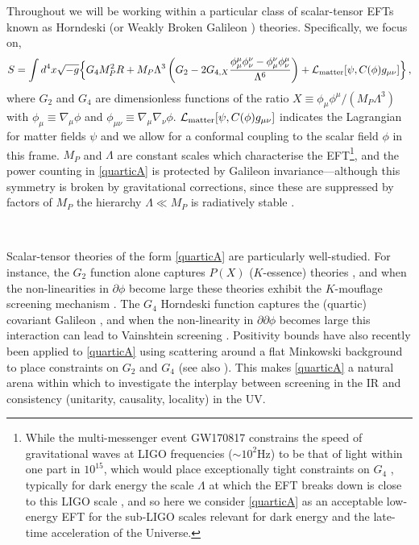 \documentclass[11pt]{article}
\begin{document}
Throughout we will be working within a particular class of scalar-tensor EFTs known as Horndeski \cite{Horndeski:1974wa,Deffayet:2009wt} (or Weakly Broken Galileon \cite{Pirtskhalava:2015nla}) theories. Specifically, we focus on, 
\begin{align}\label{quarticA}
S = \int d^4x \sqrt{-g} \Big\{   G_{4}  M_P^2 R   +  M_P \Lambda^3 \left( G_{2}   -  2 G_{4,X}  \frac{ \phi^\mu_\mu \phi^\nu_\nu - \phi_\mu^\nu \phi^\mu_\nu }{\Lambda^6}  \right)    + \mathcal{L}_{\rm matter} [ \psi , C(\phi) g_{\mu\nu} ] \Big\}\,,
\end{align}
where $G_2$ and $G_4$ are dimensionless functions of the ratio $X \equiv \phi_\mu \phi^\mu/(M_P\Lambda^3)$ with $\phi_\mu \equiv \nabla_\mu \phi$ and $\phi_{\mu\nu} \equiv \nabla_{\mu} \nabla_\nu \phi$. 
$\mathcal{L}_{\rm matter} [ \psi , C(\phi) g_{\mu\nu} ]$ indicates the Lagrangian for matter fields $\psi$ and we allow for a conformal coupling to the scalar field $\phi$ in this frame. 
%
$M_P$ and $\Lambda$ are constant scales which characterise the EFT\footnote{
While the multi-messenger event GW170817 \cite{TheLIGOScientific:2017qsa,Monitor:2017mdv,GBM:2017lvd} constrains the speed of gravitational waves at LIGO frequencies ($\sim 10^2$Hz) to be that of light within one part in $10^{15}$, which would place exceptionally tight constraints on $G_4$  \cite{Lombriser:2015sxa,Lombriser:2016yzn,Creminelli:2017sry, Sakstein:2017xjx, Ezquiaga:2017ekz, Baker:2017hug, Akrami:2018yjz, Heisenberg:2017qka, BeltranJimenez:2018ymu}, typically for dark energy the scale $\Lambda$ at which the EFT breaks down is close to this LIGO scale \cite{deRham:2018red}, and so here we consider \eqref{quarticA} as an acceptable low-energy EFT for the sub-LIGO scales relevant for dark energy and the late-time acceleration of the Universe.
}, and the power counting in \eqref{quarticA} is protected by Galileon invariance---although this symmetry is broken by gravitational corrections, since these are suppressed by factors of $M_P$ the hierarchy $ \Lambda \ll M_P$ is radiatively stable \cite{Luty:2003vm,Nicolis:2004qq,deRham:2010eu,Burrage:2010cu}.

~

Scalar-tensor theories of the form \eqref{quarticA} are particularly well-studied. For instance, the $G_2$ function alone captures $P(X)$ ($K$-essence) theories \cite{ArmendarizPicon:1999rj, Garriga:1999vw}, and when the non-linearities in $\partial \phi$ become large these theories exhibit the $K$-mouflage screening mechanism \cite{Babichev:2009ee}. The $G_4$ Horndeski function captures the (quartic) covariant Galileon \cite{Nicolis:2008in, Deffayet:2009wt}, and when the non-linearity in $\partial \partial \phi$ becomes large this interaction can lead to Vainshtein screening \cite{Vainshtein:1972sx, Koyama:2013paa}. Positivity bounds have also recently been applied to \eqref{quarticA} using scattering around a flat Minkowski background to place constraints on $G_{2}$ and $G_{4}$  \cite{Melville:2019wyy, deRham:2021fpu} (see also \cite{Kennedy:2020ehn}). This makes \eqref{quarticA} a natural arena within which to investigate the interplay between screening in the IR and consistency (unitarity, causality, locality) in the UV.
\end{document}
